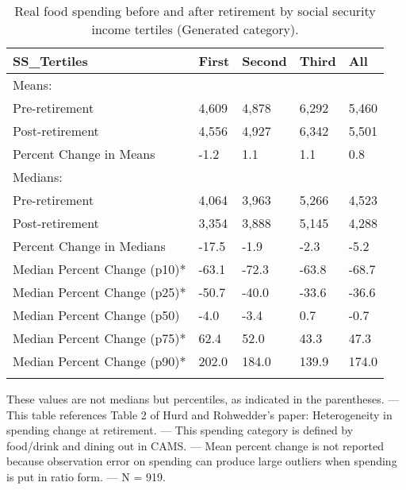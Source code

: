 \begin{table}[tbp] \centering
{}

\caption{Real food spending before and after retirement by social security income tertiles (Generated category).}
\begin{tabularx}{\textwidth}{lCCCC}

\toprule
{SS\_Tertiles}&{First}&{Second}&{Third}&{All} \tabularnewline
\midrule\addlinespace[1.5ex]
Means:&&&& \tabularnewline
\midrule Pre-retirement&4,609&4,878&6,292&5,460 \tabularnewline
Post-retirement&4,556&4,927&6,342&5,501 \tabularnewline
Percent Change in Means&-1.2&1.1&1.1&0.8 \tabularnewline
\midrule Medians:&&&& \tabularnewline
\midrule Pre-retirement&4,064&3,963&5,266&4,523 \tabularnewline
Post-retirement&3,354&3,888&5,145&4,288 \tabularnewline
Percent Change in Medians&-17.5&-1.9&-2.3&-5.2 \tabularnewline
Median Percent Change (p10)*&-63.1&-72.3&-63.8&-68.7 \tabularnewline
Median Percent Change (p25)*&-50.7&-40.0&-33.6&-36.6 \tabularnewline
Median Percent Change (p50)&-4.0&-3.4&0.7&-0.7 \tabularnewline
Median Percent Change (p75)*&62.4&52.0&43.3&47.3 \tabularnewline
Median Percent Change (p90)*&202.0&184.0&139.9&174.0 \tabularnewline
\bottomrule \addlinespace[1.5ex]

\end{tabularx}
\begin{flushleft}
\footnotesize *These values are not medians but percentiles, as indicated in the parentheses. \linebreak --- \linebreak This table references Table 2 of Hurd and Rohwedder's paper: Heterogeneity in spending change at retirement. \linebreak --- \linebreak This spending category is defined by food/drink and dining out in CAMS. \linebreak --- \linebreak Mean percent change is not reported because observation error on spending can produce large outliers when spending is put in ratio form. \linebreak --- \linebreak N = 919.
\end{flushleft}
\end{table}
